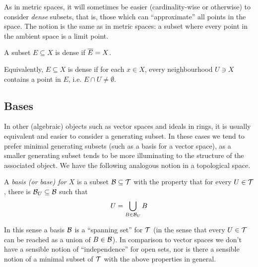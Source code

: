 \documentclass[11pt]{article}
\begin{document}


As in metric spaces, it will sometimes be easier (cardinality-wise or otherwise) to consider \emph{dense} subsets, that is, those which can ``approximate'' all points in the space. The notion is the same as in metric spaces: a subset where every point in the ambient space is a limit point.
\begin{definition}
    A subset $E \subseteq X$ is dense if $\overline{E} = X$.
\end{definition}
Equivalently, $E \subseteq X$ is dense if for each $x \in X$, every neighbourhood $U \ni X$ contains a point in $E$, i.e. $E \cap U \neq \emptyset$.
\subsection{Bases}
In other (algebraic) objects such as vector spaces and ideals in rings, it is usually equivalent and easier to consider a generating subset. In these cases we tend to prefer minimal generating subsets (such as a basis for a vector space), as a smaller generating subset tends to be more illuminating to the structure of the associated object. We have the following analogous notion in a topological space.
\begin{definition}[Basis]
    A \emph{basis (or base) for $X$} is a subset $\mathcal{B} \subseteq \mathcal{T}$ with the property that for every $U \in \mathcal{T}$, there is $\mathcal{B}_U \subseteq \mathcal{B}$ such that
    $$
        U = \bigcup_{B \in \mathcal{B}_U}B
    $$
\end{definition}
In this sense a basis $\mathcal{B}$ is a ``spanning set'' for $\mathcal{T}$ (in the sense that every $U \in \mathcal{T}$ can be reached as a union of $B \in \mathcal{B}$). In comparison to vector spaces we don't have a sensible notion of ``independence'' for open sets, nor is there a sensible notion of a minimal subset of $\mathcal{T}$ with the above properties in general.
\end{document}
